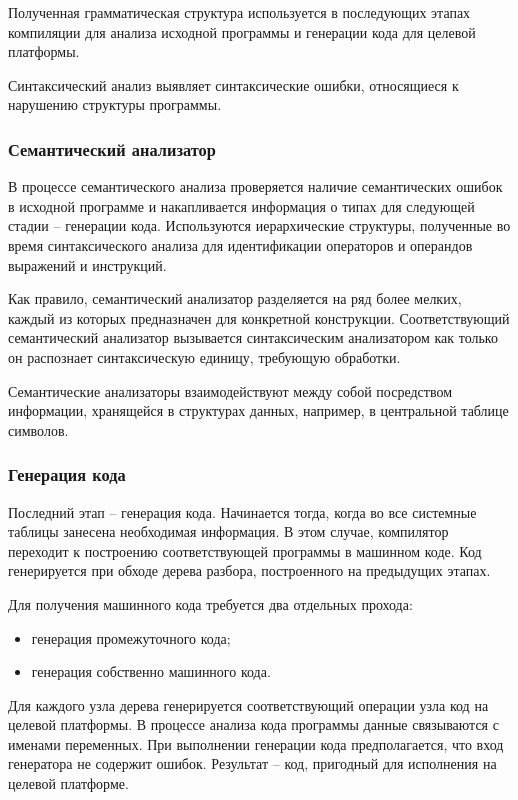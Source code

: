 Полученная грамматическая структура используется в последующих этапах компиляции для анализа исходной программы и генерации кода для целевой платформы. 

Синтаксический анализ выявляет синтаксические ошибки, относящиеся к нарушению структуры программы. \\

\subsubsection{Семантический анализатор}
В процессе семантического анализа проверяется наличие семантических ошибок в исходной программе и накапливается информация о типах для следующей стадии -- генерации кода. Используются иерархические структуры, полученные во время синтаксического анализа для идентификации операторов и операндов выражений и инструкций. 

Как правило, семантический анализатор разделяется на ряд более мелких, каждый из которых предназначен для конкретной конструкции. Соответствующий семантический анализатор вызывается синтаксическим анализатором как только он распознает синтаксическую единицу, требующую обработки.

Семантические анализаторы взаимодействуют между собой посредством информации, хранящейся в структурах данных, например, в центральной таблице символов. \\

\subsubsection{Генерация кода}
Последний этап -- генерация кода. Начинается тогда, когда во все системные таблицы занесена необходимая информация. В этом случае, компилятор переходит к построению соответствующей программы в машинном коде. Код генерируется при обходе дерева разбора, построенного на предыдущих этапах. 

Для получения машинного кода требуется два отдельных прохода:
\begin{itemize}
	\item генерация промежуточного кода;
	
	\item генерация собственно машинного кода.
\end{itemize}

Для каждого узла дерева генерируется соответствующий операции узла код на целевой платформы. В процессе анализа кода программы данные связываются с именами переменных. При выполнении генерации кода предполагается, что вход генератора не содержит ошибок. Результат -- код, пригодный для исполнения на целевой платформе. \\

